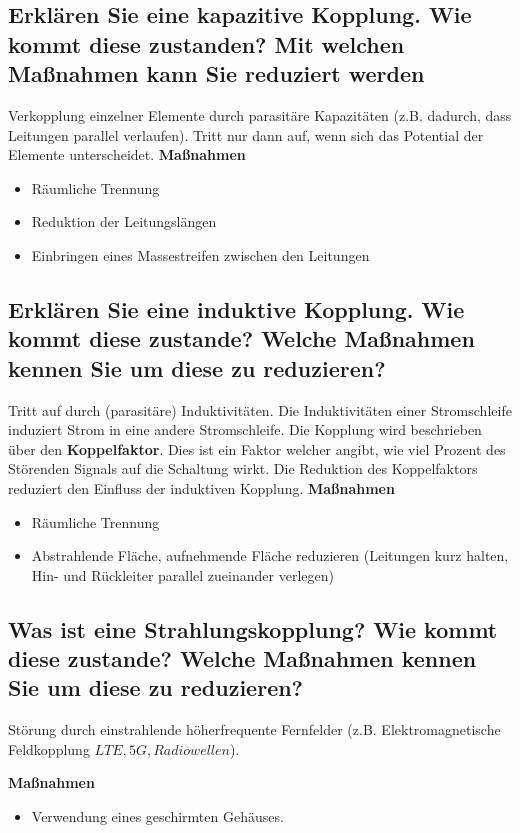 \subsection{Erklären Sie eine kapazitive Kopplung. Wie kommt diese zustanden? Mit welchen Maßnahmen kann Sie reduziert werden}
Verkopplung einzelner Elemente durch parasitäre Kapazitäten (z.B. dadurch, dass Leitungen parallel verlaufen). Tritt nur dann auf, wenn sich das Potential der Elemente unterscheidet.\p
\textbf{Maßnahmen}
\begin{itemize}
  \item Räumliche Trennung
  \item Reduktion der Leitungslängen
  \item Einbringen eines Massestreifen zwischen den Leitungen
\end{itemize}

\subsection{Erklären Sie eine induktive Kopplung. Wie kommt diese zustande? Welche Maßnahmen kennen Sie um diese zu reduzieren?}
Tritt auf durch (parasitäre) Induktivitäten. Die Induktivitäten einer Stromschleife induziert Strom in eine andere Stromschleife.\p
Die Kopplung wird beschrieben über den \textbf{Koppelfaktor}. Dies ist ein Faktor welcher angibt, wie viel Prozent des Störenden Signals auf die Schaltung wirkt. Die Reduktion des Koppelfaktors reduziert den Einfluss der induktiven Kopplung.\p
\textbf{Maßnahmen}
\begin{itemize}
  \item Räumliche Trennung
  \item Abstrahlende Fläche, aufnehmende Fläche reduzieren (Leitungen kurz halten, Hin- und Rückleiter parallel zueinander verlegen)
\end{itemize}

\subsection{Was ist eine Strahlungskopplung? Wie kommt diese zustande? Welche Maßnahmen kennen Sie um diese zu reduzieren?}
Störung durch einstrahlende höherfrequente Fernfelder (z.B. Elektromagnetische Feldkopplung \(LTE, 5G, Radiowellen\)).

\textbf{Maßnahmen}
\begin{itemize}
  \item Verwendung eines geschirmten Gehäuses.
\end{itemize}

